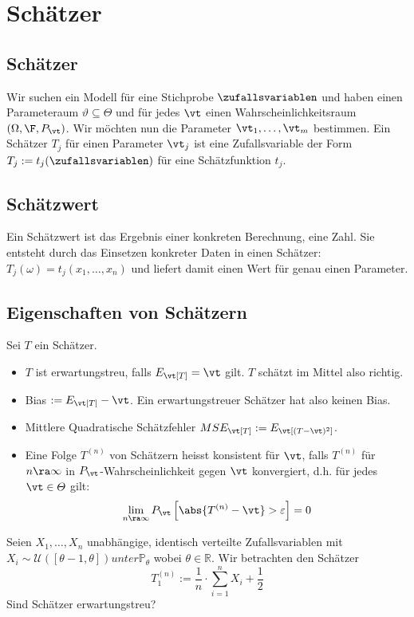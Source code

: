 
\hypertarget{sec:3}{\section{Schätzer}}
\subsection*{Schätzer}
Wir suchen ein Modell für eine Stichprobe $\zufallsvariablen$ und haben einen
Parameteraum $\vartheta \subseteq \varTheta$ und für jedes $\vt$ einen
Wahrscheinlichkeitsraum $ (\Omega, \F, P_\vt)$. Wir möchten nun die Parameter
$\vt_1, \dots, \vt_m$ bestimmen. Ein Schätzer $T_j$ für einen Parameter $\vt_j$
ist eine Zufallsvariable der Form $T_j := t_j (\zufallsvariablen)$ für eine
Schätzfunktion $t_j$.
\subsection*{Schätzwert}
Ein Schätzwert ist das Ergebnis einer konkreten Berechnung, eine Zahl. Sie
entsteht durch das Einsetzen konkreter Daten in einen Schätzer: $T_j (\omega) =
  t_j (x_1, \dots, x_n)$ und liefert damit einen Wert für genau einen Parameter.
\subsection*{Eigenschaften von Schätzern}
Sei $T$ ein Schätzer.
\begin{itemize}
  \item $T$ ist erwartungstreu, falls $E_\vt[T] = \vt$ gilt. $T$ schätzt
        im Mittel also richtig.
  \item Bias $:= E_\vt[T] - \vt$. Ein erwartungstreuer Schätzer hat also keinen Bias.
  \item Mittlere Quadratische Schätzfehler $MSE_\vt[T] := E_\vt[ (T - \vt)^2]$.
  \item Eine Folge $T^{ (n)}$ von Schätzern heisst konsistent für $\vt$, falls $T^{
              (n)}$ für $n \ra \infty$ in $P_\vt$-Wahrscheinlichkeit gegen $\vt$ konvergiert,
        d.h. für jedes $\vt \in \varTheta$ gilt:
        \begin{align*}
          \lim_{n \ra \infty} P_\vt \left[ \abs{T^{ (n)} - \vt} > \varepsilon \right] = 0
        \end{align*}
\end{itemize}
\BoxStart{}

Seien $X_1, \ldots, X_n$ unabhängige, identisch verteilte Zufallsvariablen mit $X_i \sim \mathcal{U}([\theta - 1, \theta]) unter \mathbb{P}_\theta$ 
wobei $\theta \in \mathbb{R}$. Wir betrachten den Schätzer 
\[T_1^{(n)} := \frac{1}{n} \cdot \sum_{i = 1}^n X_i + \frac{1}{2}\]
Sind Schätzer erwartungstreu?

